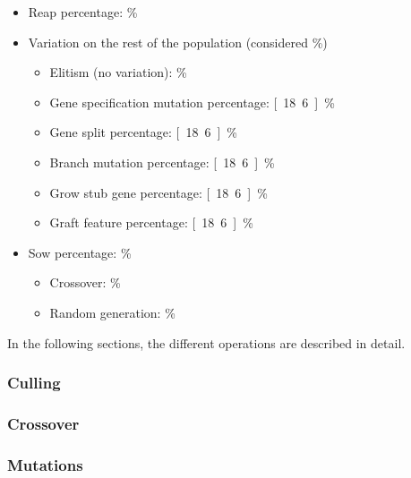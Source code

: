 \documentclass[main]{subfiles}
\begin{document}
\begin{itemize}
\item Reap percentage: \unit[15]{\%}
\item Variation on the rest of the population (considered \unit[100]{\%})
\begin{itemize}
\item Elitism (no variation): \unit[7]{\%}
\item Gene specification mutation percentage: \unit[18.6]{\%}
\item Gene split percentage: \unit[18.6]{\%}
\item Branch mutation percentage: \unit[18.6]{\%}
\item Grow stub gene percentage: \unit[18.6]{\%}
\item Graft feature percentage: \unit[18.6]{\%}
\end{itemize}
\item Sow percentage: \unit[15]{\%}
\begin{itemize}
\item Crossover: \unit[50]{\%}
\item Random generation: \unit[50]{\%}
\end{itemize}
\end{itemize}

In the following sections, the different operations are described in detail.

\subsubsection{Culling}
\label{subsubsection:Culling}

\lipsum[14]


\subsubsection{Crossover}

\lipsum[14]


\subsubsection{Mutations}

\end{document}
